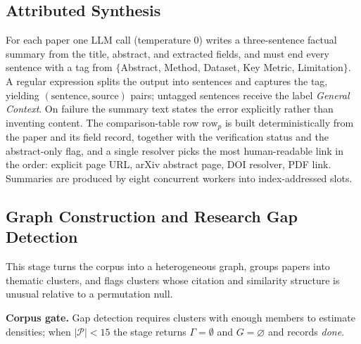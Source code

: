 \documentclass[conference]{IEEEtran}
\newcommand{\cP}{\mathcal{P}}
\begin{document}
\subsection{Attributed Synthesis}
For each paper one LLM call (temperature $0$) writes a three-sentence factual summary from the title, abstract, and extracted fields, and must end every sentence with a tag from $\{$Abstract, Method, Dataset, Key Metric, Limitation$\}$. A regular expression splits the output into sentences and captures the tag, yielding $(\text{sentence},\text{source})$ pairs; untagged sentences receive the label \emph{General Context}. On failure the summary text states the error explicitly rather than inventing content. The comparison-table row $\mathrm{row}_p$ is built deterministically from the paper and its field record, together with the verification status and the abstract-only flag, and a single resolver picks the most human-readable link in the order: explicit page URL, arXiv abstract page, DOI resolver, PDF link. Summaries are produced by eight concurrent workers into index-addressed slots.

\subsection{Graph Construction and Research Gap Detection}
\label{sec:gap}
This stage turns the corpus into a heterogeneous graph, groups papers into thematic clusters, and flags clusters whose citation and similarity structure is unusual relative to a permutation null.

\textbf{Corpus gate.} Gap detection requires clusters with enough members to estimate densities; when $|\cP|<15$ the stage returns $\Gamma=\emptyset$ and $G=\varnothing$ and records \textit{done}.
\end{document}
